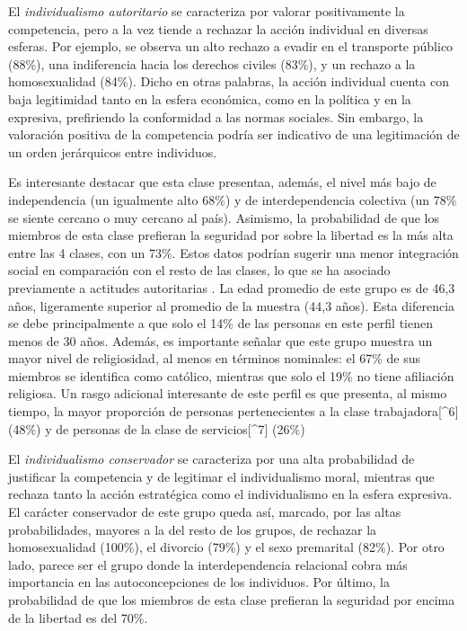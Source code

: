 \documentclass[12pt,twoside]{templates/facsothesis}
\begin{document}
El \emph{individualismo autoritario} se caracteriza por valorar positivamente la competencia, pero a la vez tiende a rechazar la acción individual en diversas esferas. Por ejemplo, se observa un alto rechazo a evadir en el transporte público (88\%), una indiferencia hacia los derechos civiles (83\%), y un rechazo a la homosexualidad (84\%). Dicho en otras palabras, la acción individual cuenta con baja legitimidad tanto en la esfera económica, como en la política y en la expresiva, prefiriendo la conformidad a las normas sociales. Sin embargo, la valoración positiva de la competencia podría ser indicativo de una legitimación de un orden jerárquicos entre individuos.

Es interesante destacar que esta clase presentaa, además, el nivel más bajo de independencia (un igualmente alto 68\%) y de interdependencia colectiva (un 78\% se siente cercano o muy cercano al país). Asimismo, la probabilidad de que los miembros de esta clase prefieran la seguridad por sobre la libertad es la más alta entre las 4 clases, con un 73\%. Estos datos podrían sugerir una menor integración social en comparación con el resto de las clases, lo que se ha asociado previamente a actitudes autoritarias \citep{gidron2020}. La edad promedio de este grupo es de 46,3 años, ligeramente superior al promedio de la muestra (44,3 años). Esta diferencia se debe principalmente a que solo el 14\% de las personas en este perfil tienen menos de 30 años. Además, es importante señalar que este grupo muestra un mayor nivel de religiosidad, al menos en términos nominales: el 67\% de sus miembros se identifica como católico, mientras que solo el 19\% no tiene afiliación religiosa. Un rasgo adicional interesante de este perfil es que presenta, al mismo tiempo, la mayor proporción de personas pertenecientes a la clase trabajadora{[}\^{}6{]} (48\%) y de personas de la clase de servicios{[}\^{}7{]} (26\%)

El \emph{individualismo conservador} se caracteriza por una alta probabilidad de justificar la competencia y de legitimar el individualismo moral, mientras que rechaza tanto la acción estratégica como el individualismo en la esfera expresiva. El carácter conservador de este grupo queda así, marcado, por las altas probabilidades, mayores a la del resto de los grupos, de rechazar la homosexualidad (100\%), el divorcio (79\%) y el sexo premarital (82\%). Por otro lado, parece ser el grupo donde la interdependencia relacional cobra más importancia en las autoconcepciones de los individuos. Por último, la probabilidad de que los miembros de esta clase prefieran la seguridad por encima de la libertad es del 70\%.
\end{document}
